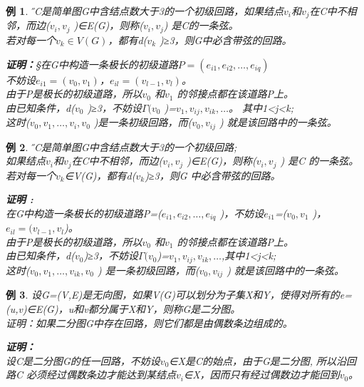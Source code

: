 \documentclass[11pt,a4paper,openany]{book}
\newtheorem{sample}{\textbf{例}}[section]
\begin{document}
\begin{sample}
\H 设C是简单图G中含结点数大于3的一个初级回路，如果结点$v_i$和$v_j$在C中不相邻，而边($v_i,v_j$ )∈E(G)，则称($v_i,v_j $) 是C的一条弦。\\
若对每一个$v_k∈V(G)$，都有d($v_k$ )≥3，则G中必含带弦的回路。
\begin{adjustwidth}{0.62cm}{0.62cm}
\textbf{证明：}\S {在G中构造一条极长的初级道路$P=(e_{i1},e_{i2},\dots,e_{iq} )$\\
不妨设$e_{i1}=(v_0,v_1 )$，$e_{il}=(v_{l-1},v_l )$。\\
由于P是极长的初级道路，所以$v_0$ 和$v_1$ 的邻接点都在该道路P上。\\
由已知条件，d($v_0$ )≥3，不妨设$\Gamma(v_0$ )={$v_1,v_{ij},v_{ik},\dots$}。 其中1<j<k;\\
这时($v_0,v_1,\dots,v_{i},v_0$ )是一条初级回路，而($v_0,v_{ij}$ ) 就是该回路中的一条弦。}
 \end{adjustwidth}
\end{sample}
\begin{sample}\H
设C是简单图G中含结点数大于3的一个初级回路;\\
如果结点$v_i$和$v_j$在C中不相邻，而边($v_i,v_j$ )∈E(G)，则称($v_i,v_j$ ) 是C 的一条弦。\\
若对每一个$v_k$∈V(G)，都有d($v_k$)≥3，则G 中必含带弦的回路。
\begin{adjustwidth}{0.62cm}{0.62cm}
\textbf{证明 :}\\
 在G中构造一条极长的初级道路P=($e_{i1},e_{i2},\dots,e_{iq}$ )，不妨设$e_{i1}$=($v_0,v_1$ )，$e_{il}=(v_{l-1},v_l $)。\\
 由于P是极长的初级道路，所以$v_0$ 和$v_1$ 的邻接点都在该道路P上。\\
 由已知条件，d($v_0$)≥3，不妨设$\Gamma(v_0$)={$v_1,v_{ij},v_{ik},\dots$},其中1<j<k;\\
 这时($v_0,v_1,\dots,v_{ik},v_0$ ) 是一条初级回路，而($v_0,v_{ij}$ ) 就是该回路中的一条弦。\\
\end{adjustwidth}
\end{sample}
\begin{sample}\H{
设G=(V,E)是无向图，如果V(G)可以划分为子集X和Y，使得对所有的e=(u,v)∈E(G)，u和v都分属于X和Y，则称G是二分图。\\
证明：如果二分图G中存在回路，则它们都是由偶数条边组成的。\\}
\begin{adjustwidth}{0.62cm}{0.62cm}
\textbf{证明：}\\
设C是二分图G的任一回路，不妨设$v_0$∈X是C的始点，由于G是二分图, 所以沿回路C 必须经过偶数条边才能达到某结点$v_i$∈X，因而只有经过偶数边才能回到$v_0$。\\
\end{adjustwidth}
\end{sample}
\end{document}
